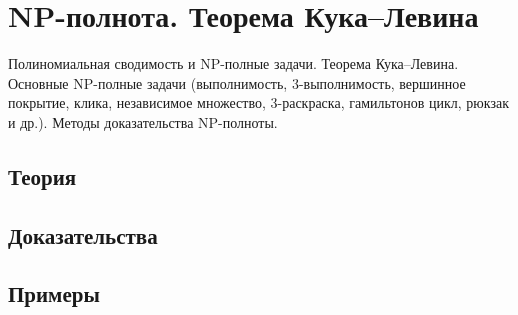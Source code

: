 
\section{NP-полнота. Теорема Кука–Левина}
\label{sec:2.3a.12-np-completeness}

\begin{ticket}
Полиномиальная сводимость и NP-полные задачи. Теорема Кука–Левина. Основные NP-полные задачи (выполнимость, 3-выполнимость, вершинное покрытие, клика, независимое множество, 3-раскраска, гамильтонов цикл, рюкзак и др.). Методы доказательства NP-полноты.
\end{ticket}

\subsection*{Теория}

\subsection*{Доказательства}

\subsection*{Примеры}
